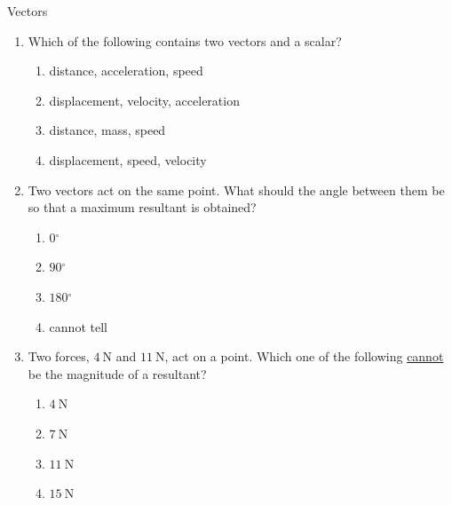\begin{eocexercises}{Vectors}
\begin{enumerate}[noitemsep, label=\textbf{\arabic*}.]
\label{m38819*uid102}\item Which of the following contains two vectors and a scalar?
\label{m38819*id197890}\begin{enumerate}[noitemsep, label=\textbf{\alph*}. ] 
            \label{m38819*uid103}\item distance, acceleration, speed
\label{m38819*uid104}\item displacement, velocity, acceleration
\label{m38819*uid105}\item distance, mass, speed
\label{m38819*uid106}\item displacement, speed, velocity
\end{enumerate}
                \label{m38819*uid107}\item Two vectors act on the same point. What should the angle between them be so that a maximum resultant is obtained?
\label{m38819*id197965}\begin{enumerate}[noitemsep, label=\textbf{\alph*}. ] 
            \label{m38819*uid108}\item $0{}^{\circ }$\label{m38819*uid109}\item $90{}^{\circ }$\label{m38819*uid110}\item $180{}^{\circ }$\label{m38819*uid111}\item cannot tell
\end{enumerate}
                \label{m38819*uid112}\item Two forces, $4 ~\text{N}$ and $11 ~\text{N}$, act on a point. Which one of the following \uline{cannot} be the magnitude of a resultant?
\label{m38819*id198082}\begin{enumerate}[noitemsep, label=\textbf{\alph*}. ] 
            \label{m38819*uid113}\item $4 ~\text{N}$
\label{m38819*uid114}\item $7 ~\text{N}$
\label{m38819*uid115}\item $11 ~\text{N}$
\label{m38819*uid116}\item $15 ~\text{N}$
\end{enumerate}


\end{enumerate}
\end{eocexercises}
